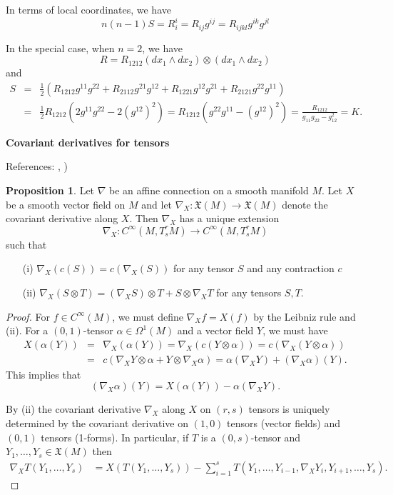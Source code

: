 \documentclass{amsart}
\numberwithin{equation}{section}
\newcommand{\fX}{\mathfrak{X}}
\theoremstyle{definition}
\theoremstyle{theorem}
\newtheorem{proposition}[definition]{Proposition}
\begin{document}
In terms of local coordinates, we have 
\[
n(n-1)S = R_i^i = R_{ij}g^{ij} = R_{ijkl} g^{ik}g^{jl}
\]

In the special case, when $n = 2$, we have 
\[
R = R_{1212} (dx_1 \wedge dx_2) \otimes (dx_1 \wedge dx_2)
\]
and 
\begin{eqnarray*}
S &=& \frac{1}{2} (R_{1212}g^{11}g^{22}  + R_{2112}g^{21}g^{12} + R_{1221}g^{12}g^{21}+ R_{2121} g^{22}g^{11}) \\
&=&  \frac{1}{2} R_{1212} (2 g^{11}g^{22} - 2 (g^{12})^2) 
= R_{1212}(g^{22}g^{11} - (g^{12})^2) = \frac{R_{1212}}{g_{11}g_{22} - g_{12}^2} = K.
\end{eqnarray*}

\bigskip

\noindent
{\bf \large Covariant derivatives for tensors} 

References: \cite[Chapter 4 Section 5]{dC}, \cite[2B.3]{GHL})

\begin{proposition}
Let $\nabla$ be an affine connection on a smooth manifold $M$. 
Let $X$ be a smooth vector field on $M$ and let $\nabla_X : \mathfrak{X}(M) \to \mathfrak{X}(M)$ denote the covariant derivative along $X$. Then $\nabla_X$ has a unique extension 
\[
\nabla_X : C^\infty(M, T_{s}^rM) \to C^\infty(M, T_{s}^rM) 
\]
such that 
\begin{enumerate}
\item[(i)] $\nabla_X(c(S)) = c(\nabla_X(S))$ for any tensor $S$ and any contraction $c$
\item[(ii)] $\nabla_X(S \otimes T) = (\nabla_X S) \otimes T + S \otimes \nabla_X T$ for any tensors $S,T$. 
\end{enumerate}
\end{proposition}

\begin{proof}
For $f\in C^\infty(M)$, we must define $\nabla_Xf = X(f)$ by the Leibniz rule and (ii). For a $(0,1)$-tensor $\alpha \in \Omega^1(M)$  and a vector field $Y$, we must have 
\begin{eqnarray*}
X(\alpha(Y)) &=& \nabla_X(\alpha(Y)) 
= \nabla_X(c(Y \otimes \alpha)) 
= c(\nabla_X( Y \otimes \alpha))\\
& = & c(\nabla_X Y \otimes \alpha + Y \otimes \nabla_X \alpha ) 
= \alpha(\nabla_X Y) + (\nabla_X\alpha)(Y).
\end{eqnarray*}
This implies that 
\[
(\nabla_X\alpha)(Y) = X(\alpha(Y)) - \alpha(\nabla_X Y). 
\]

By (ii) the covariant derivative $\nabla_X$ along $X$ on $(r,s)$ tensors is
uniquely determined by the covariant derivative on $(1,0)$ tensors (vector fields) and 
$(0,1)$ tensors (1-forms). In particular, if
$T$ is a $(0,s)$-tensor and $Y_1, \ldots, Y_s \in \fX(M)$ then 
\begin{align*}
\nabla_XT(Y_1, \ldots, Y_s) &=  X(T(Y_1, \ldots, Y_s)) - \sum_{i=1}^s T(Y_1, \ldots, Y_{i-1}, \nabla_X Y_i, Y_{i+1}, \ldots, Y_s). 
\end{align*}
\end{proof}
\end{document}
